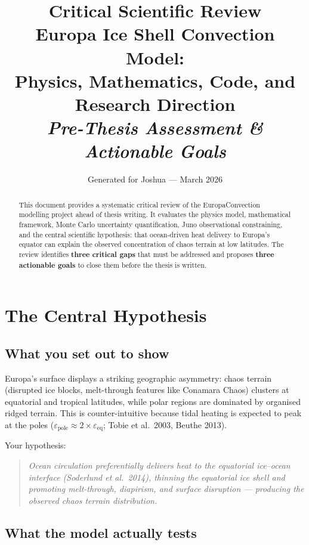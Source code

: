 \documentclass[11pt,a4paper]{article}
\title{\textbf{Critical Scientific Review}\\[0.3em]
\Large Europa Ice Shell Convection Model:\\
Physics, Mathematics, Code, and Research Direction\\[0.5em]
\large\textit{Pre-Thesis Assessment \& Actionable Goals}}
\author{Generated for Joshua --- March 2026}
\date{}
\begin{document}
\maketitle
\thispagestyle{fancy}

\begin{abstract}
This document provides a systematic critical review of the EuropaConvection
modelling project ahead of thesis writing. It evaluates the physics model,
mathematical framework, Monte Carlo uncertainty quantification, Juno
observational constraining, and the central scientific hypothesis: that
ocean-driven heat delivery to Europa's equator can explain the observed
concentration of chaos terrain at low latitudes. The review identifies
\textbf{three critical gaps} that must be addressed and proposes
\textbf{three actionable goals} to close them before the thesis is written.
\end{abstract}

\tableofcontents
\newpage

\section{The Central Hypothesis}

\subsection{What you set out to show}

Europa's surface displays a striking geographic asymmetry: chaos terrain
(disrupted ice blocks, melt-through features like Conamara Chaos) clusters
at equatorial and tropical latitudes, while polar regions are dominated
by organised ridged terrain. This is counter-intuitive because tidal
heating is expected to peak at the poles ($\varepsilon_\mathrm{pole}
\approx 2\times \varepsilon_\mathrm{eq}$; Tobie et al.\ 2003, Beuthe 2013).

Your hypothesis:
\begin{quote}
\textit{Ocean circulation preferentially delivers heat to the equatorial
ice--ocean interface (Soderlund et al.\ 2014), thinning the equatorial ice
shell and promoting melt-through, diapirism, and surface disruption ---
producing the observed chaos terrain distribution.}
\end{quote}

\subsection{What the model actually tests}
\end{document}
